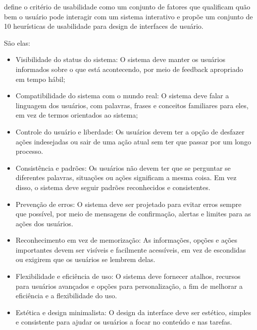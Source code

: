  define o critério de usabilidade como um conjunto de fatores que qualificam 
quão bem o usuário pode interagir com um sistema interativo e propõe um conjunto de 10 
heurísticas de usabilidade para design de interfaces de usuário.

\begin{description}
  \item São elas:
        \begin{itemize}
            \item Visibilidade do status do sistema: O sistema deve manter os usuários informados sobre o que está 
            acontecendo, por meio de feedback apropriado em tempo hábil;

            \item Compatibilidade do sistema com o mundo real: O sistema deve falar a linguagem dos usuários, com 
            palavras, frases e conceitos familiares para eles, em vez de termos orientados ao sistema;

            \item Controle do usuário e liberdade: Os usuários devem ter a opção de desfazer ações indesejadas ou sair 
            de uma ação atual sem ter que passar por um longo processo.

            \item Consistência e padrões: Os usuários não devem ter que se perguntar se diferentes palavras, situações 
            ou ações significam a mesma coisa. Em vez disso, o sistema deve seguir padrões reconhecidos e consistentes.

            \item Prevenção de erros: O sistema deve ser projetado para evitar erros sempre que possível, por meio de 
            mensagens de confirmação, alertas e limites para as ações dos usuários.
            
            \item Reconhecimento em vez de memorização: As informações, opções e ações importantes devem ser visíveis e 
            facilmente acessíveis, em vez de escondidas ou exigirem que os usuários se lembrem delas.

            \item Flexibilidade e eficiência de uso: O sistema deve fornecer atalhos, recursos para usuários avançados e 
            opções para personalização, a fim de melhorar a eficiência e a flexibilidade do uso.

            \item Estética e design minimalista: O design da interface deve ser estético, simples e consistente para ajudar
             os usuários a focar no conteúdo e nas tarefas.
            

\end{itemize}
\end{description}
